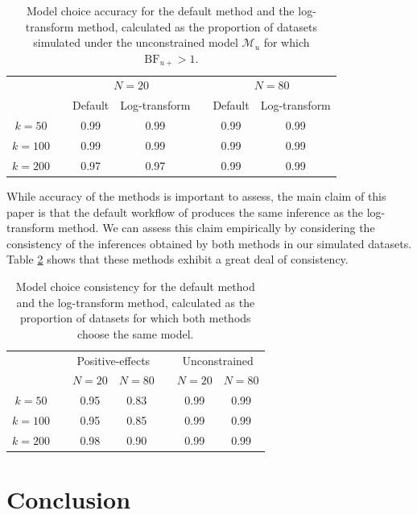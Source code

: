 \documentclass[12pt,twoside,a4paper]{article}
\begin{document}
\begin{table}
  \centering \small
  \begin{tabular}{ccccccc}
    \hline
    & & \multicolumn{2}{c}{$N=20$} & & \multicolumn{2}{c}{$N=80$}\\
    & & Default & Log-transform & & Default & Log-transform\\
    \hline
    $k=50$ & &  0.99 & 0.99 & & 0.99 & 0.99\\
    $k=100$ & & 0.99 & 0.99 & & 0.99 & 0.99\\
    $k=200$ & & 0.97 & 0.97 & & 0.99 & 0.99\\
    \hline
    
  \end{tabular}
  \caption{Model choice accuracy for the default \citet{haaf2017} method and the log-transform method, calculated as the proportion of datasets simulated under the unconstrained model $\mathcal{M}_u$ for which $\text{BF}_{u+}>1$.}
  \label{tab:accU}
\end{table}

While accuracy of the methods is important to assess, the main claim of this paper is that the default workflow of \citet{haaf2017} produces the same inference as the log-transform method. We can assess this claim empirically by considering the consistency of the inferences obtained by both methods in our simulated datasets. Table \ref{tab:con} shows that these methods exhibit a great deal of consistency.

\begin{table}
  \centering \small
  \begin{tabular}{ccccccc}
    \hline
    & & \multicolumn{2}{c}{Positive-effects} & & \multicolumn{2}{c}{Unconstrained}\\
    & & $N=20$ & $N=80$ & & $N=20$ & $N=80$\\
    \hline
    $k=50$ & &  0.95 & 0.83 & & 0.99 & 0.99\\
    $k=100$ & & 0.95 & 0.85 & & 0.99 & 0.99\\
    $k=200$ & & 0.98 & 0.90 & & 0.99 & 0.99\\
    \hline
    
  \end{tabular}
  \caption{Model choice consistency for the default \citet{haaf2017} method and the log-transform method, calculated as the proportion of datasets for which both methods choose the same model.}
  \label{tab:con}
\end{table}


\section{Conclusion}
\end{document}
